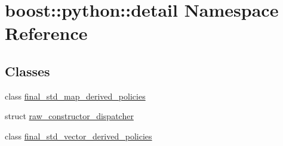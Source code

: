 \hypertarget{namespaceboost_1_1python_1_1detail}{\section{boost\-:\-:python\-:\-:detail Namespace Reference}
\label{namespaceboost_1_1python_1_1detail}
}
\subsection*{Classes}
\begin{DoxyCompactItemize}
\item 
class \hyperlink{classboost_1_1python_1_1detail_1_1final__std__map__derived__policies}{final\-\_\-std\-\_\-map\-\_\-derived\-\_\-policies}
\item 
struct \hyperlink{structboost_1_1python_1_1detail_1_1raw__constructor__dispatcher}{raw\-\_\-constructor\-\_\-dispatcher}
\item 
class \hyperlink{classboost_1_1python_1_1detail_1_1final__std__vector__derived__policies}{final\-\_\-std\-\_\-vector\-\_\-derived\-\_\-policies}
\end{DoxyCompactItemize}
